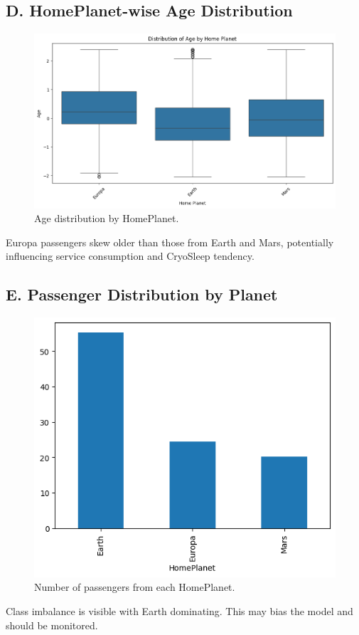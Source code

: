 \documentclass[12pt]{article}
\begin{document}
\subsection*{D. HomePlanet-wise Age Distribution}
\begin{figure}[H]
    \centering
    \includegraphics[width=0.8\linewidth]{output4.png}
    \caption{Age distribution by HomePlanet.}
\end{figure}
\noindent
Europa passengers skew older than those from Earth and Mars, potentially influencing service consumption and CryoSleep tendency.

\subsection*{E. Passenger Distribution by Planet}
\begin{figure}[H]
    \centering
    \includegraphics[width=0.5\linewidth]{output5.png}
    \caption{Number of passengers from each HomePlanet.}
\end{figure}
\noindent
Class imbalance is visible with Earth dominating. This may bias the model and should be monitored.
\end{document}
